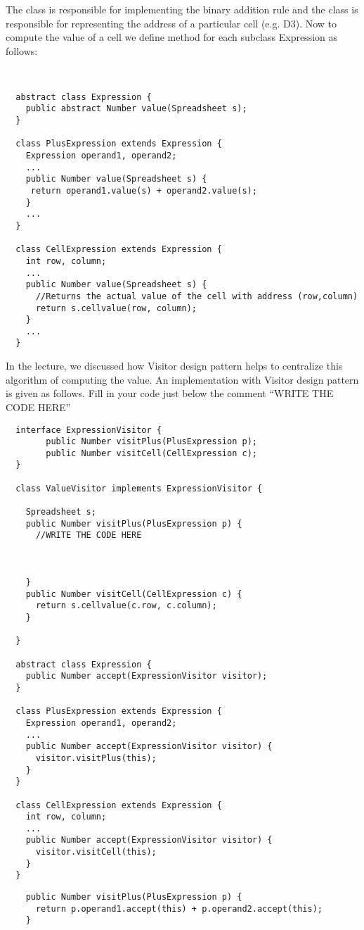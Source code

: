 {{The class  is responsible for implementing the binary addition
rule and the class  is responsible for representing the address of
a particular cell (e.g. D3).  Now to compute the value of a cell we define
method  for each subclass Expression as follows:

  \begin{lstlisting}


  abstract class Expression {
    public abstract Number value(Spreadsheet s);
  }

  class PlusExpression extends Expression {
    Expression operand1, operand2;
    ...
    public Number value(Spreadsheet s) {
     return operand1.value(s) + operand2.value(s);
    }
    ...
  }

  class CellExpression extends Expression {
    int row, column;
    ...
    public Number value(Spreadsheet s) {
      //Returns the actual value of the cell with address (row,column)
      return s.cellvalue(row, column); 
    }
    ...
  }
  \end{lstlisting}
  In the lecture, we discussed how Visitor design pattern helps  to centralize
  this algorithm of computing the value.  An implementation with Visitor design
  pattern is given as follows. Fill in your code just below the comment ``WRITE
  THE CODE HERE''

  \begin{lstlisting}
  interface ExpressionVisitor {
        public Number visitPlus(PlusExpression p);
        public Number visitCell(CellExpression c);
  }

  class ValueVisitor implements ExpressionVisitor {

    Spreadsheet s;
    public Number visitPlus(PlusExpression p) {
      //WRITE THE CODE HERE



    }
    public Number visitCell(CellExpression c) {
      return s.cellvalue(c.row, c.column);
    }
  
  }

  abstract class Expression {
    public Number accept(ExpressionVisitor visitor);
  }

  class PlusExpression extends Expression {
    Expression operand1, operand2;
    ...
    public Number accept(ExpressionVisitor visitor) {
      visitor.visitPlus(this);
    }  
  }

  class CellExpression extends Expression {
    int row, column;
    ...
    public Number accept(ExpressionVisitor visitor) {
      visitor.visitCell(this);
    }  
  }
  \end{lstlisting}

  \begin{solution} [0 in]
  \begin{lstlisting}
    public Number visitPlus(PlusExpression p) {
      return p.operand1.accept(this) + p.operand2.accept(this);
    }
  \end{lstlisting}
  \end{solution} 
}
} %

